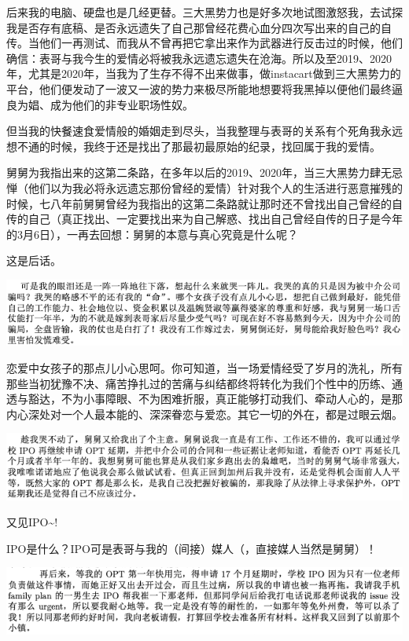 \documentclass[9pt, b5paper]{article}
\begin{document}
后来我的电脑、硬盘也是几经更替。三大黑势力也是好多次地试图激怒我，去试探我是否存有底稿、是否永远遗失了自己那曾经花费心血分四次写出来的自己的自传。当他们一再测试、而我从不曾再把它拿出来作为武器进行反击过的时候，他们确信：表哥与我今生的爱情必将被我永远遗忘遗失在沧海。所以及至2019、2020年，尤其是2020年，当我为了生存不得不出来做事，做instacart做到三大黑势力的平台，他们便发动了一波又一波的势力来极尽所能地想要将我黑掉以便他们最终逼良为娼、成为他们的非专业职场性奴。

但当我的快餐速食爱情般的婚姻走到尽头，当我整理与表哥的关系有个死角我永远想不通的时候，我终于还是找出了那最初最原始的纪录，找回属于我的爱情。 

舅舅为我指出来的这第二条路，在多年以后的2019、2020年，当三大黑势力肆无忌惮（他们以为我必将永远遗忘那份曾经的爱情）针对我个人的生活进行恶意摧残的时候，七八年前舅舅曾经为我指出的这第二条路就让那时还不曾找出自己曾经的自传的自己（真正找出、一定要找出来为自己解惑、找出自己曾经自传的日子是今年的3月6日），一再去回想：舅舅的本意与真心究竟是什么呢？

这是后话。 

\begin{center}
\includegraphics[width=.9\linewidth]{./pic/p1p119-6.png}
\end{center}

恋爱中女孩子的那点儿小心思呵。你可知道，当一场爱情经受了岁月的洗礼，所有那些当初犹豫不决、痛苦挣扎过的苦痛与纠结都终将转化为我们个性中的历练、通透与豁达，不为小事障眼、不为困难折服，真正能够打动我们、牵动人心的，是那内心深处对一个人最本能的、深深眷恋与爱恋。其它一切的外在，都是过眼云烟。 

\begin{center}
\includegraphics[width=.9\linewidth]{./pic/p1p119-7.png}
\end{center}

又见IPO\textasciitilde{}!

IPO是什么？IPO可是表哥与我的（间接）媒人（，直接媒人当然是舅舅）！

\begin{center}
\includegraphics[width=.9\linewidth]{./pic/p1p40-1.png}
\end{center}
\end{document}

